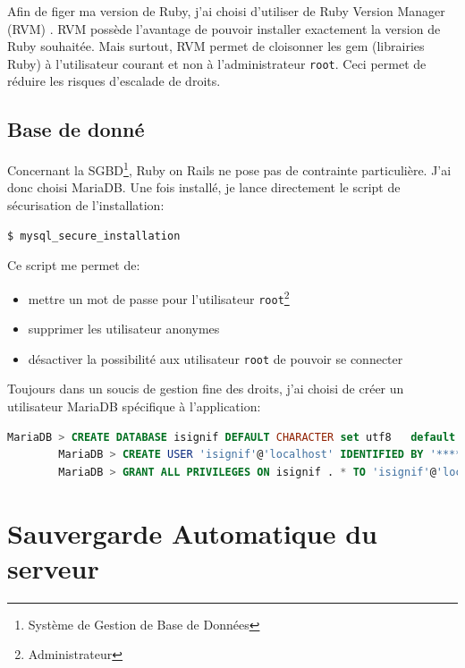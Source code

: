 \documentclass[]{report}
\begin{document}
      Afin de figer ma version de Ruby, j’ai choisi d’utiliser de Ruby Version Manager (RVM) . RVM possède l’avantage de pouvoir installer exactement la version de Ruby souhaitée. Mais surtout, RVM permet de cloisonner les gem (librairies Ruby) à l’utilisateur courant et non à l’administrateur \verb|root|. Ceci permet de réduire les risques d’escalade de droits.

    \subsection{Base de donné}

      Concernant la SGBD\footnote{Système de Gestion de Base de Données}, Ruby on Rails ne pose pas de contrainte particulière. J’ai donc choisi MariaDB. Une fois installé, je lance directement le script de sécurisation de l’installation:

      \begin{scriptsize}
      \begin{lstlisting}[language=bash]
      $ mysql_secure_installation
      \end{lstlisting}
      \end{scriptsize}

      Ce script me permet de:

      \begin{itemize}
      \item mettre un mot de passe pour l’utilisateur \verb|root|\footnote{Administrateur}
      \item supprimer les utilisateur anonymes
      \item désactiver la possibilité aux utilisateur \verb|root| de pouvoir se connecter
      \end{itemize}

      Toujours dans un soucis de gestion fine des droits, j’ai choisi de créer un utilisateur MariaDB spécifique à l’application:

      \begin{scriptsize}
        \begin{lstlisting}[language=sql]
        MariaDB > CREATE DATABASE isignif DEFAULT CHARACTER set utf8   default COLLATE utf8_general_ci;
        MariaDB > CREATE USER 'isignif'@'localhost' IDENTIFIED BY '****';
        MariaDB > GRANT ALL PRIVILEGES ON isignif . * TO 'isignif'@'localhost';
        \end{lstlisting}
      \end{scriptsize}

  \section{Sauvergarde Automatique du serveur}
\end{document}
